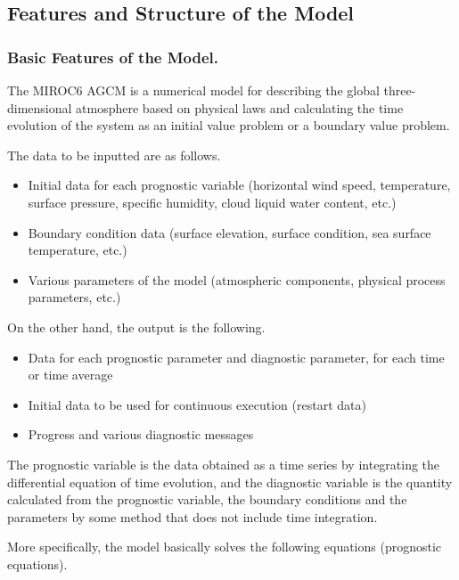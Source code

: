 \hypertarget{features-and-structure-of-the-model}{%
\subsection{Features and Structure of the
Model}\label{features-and-structure-of-the-model}}

\hypertarget{basic-features-of-the-model.}{%
\subsubsection{Basic Features of the
Model.}\label{basic-features-of-the-model.}}

The MIROC6 AGCM is a numerical model for describing the global
three-dimensional atmosphere based on physical laws and calculating the
time evolution of the system as an initial value problem or a boundary
value problem.

The data to be inputted are as follows.

\begin{itemize}
\item
  Initial data for each prognostic variable (horizontal wind speed,
  temperature, surface pressure, specific humidity, cloud liquid water
  content, etc.)
\item
  Boundary condition data (surface elevation, surface condition, sea
  surface temperature, etc.)
\item
  Various parameters of the model (atmospheric components, physical
  process parameters, etc.)
\end{itemize}

On the other hand, the output is the following.

\begin{itemize}
\item
  Data for each prognostic parameter and diagnostic parameter, for each
  time or time average
\item
  Initial data to be used for continuous execution (restart data)
\item
  Progress and various diagnostic messages
\end{itemize}

The prognostic variable is the data obtained as a time series by
integrating the differential equation of time evolution, and the
diagnostic variable is the quantity calculated from the prognostic
variable, the boundary conditions and the parameters by some method that
does not include time integration.

More specifically, the model basically solves the following equations
(prognostic equations).

